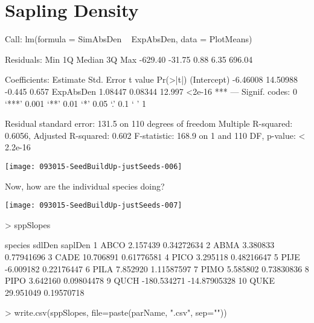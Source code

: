 \documentclass{article}
\begin{document}
\newpage

\section{Sapling Density}
\begin{Schunk}
\begin{Soutput}
Call:
lm(formula = SimAbsDen ~ ExpAbsDen, data = PlotMeans)

Residuals:
    Min      1Q  Median      3Q     Max 
-629.40  -31.75    0.88    6.35  696.04 

Coefficients:
            Estimate Std. Error t value Pr(>|t|)    
(Intercept) -6.46008   14.50988  -0.445    0.657    
ExpAbsDen    1.08447    0.08344  12.997   <2e-16 ***
---
Signif. codes:  0 ‘***’ 0.001 ‘**’ 0.01 ‘*’ 0.05 ‘.’ 0.1 ‘ ’ 1

Residual standard error: 131.5 on 110 degrees of freedom
Multiple R-squared:  0.6056,	Adjusted R-squared:  0.602 
F-statistic: 168.9 on 1 and 110 DF,  p-value: < 2.2e-16
\end{Soutput}
\end{Schunk}
\texttt{[image: 093015-SeedBuildUp-justSeeds-006]}

Now, how are the individual species doing?

\texttt{[image: 093015-SeedBuildUp-justSeeds-007]}
\begin{Schunk}
\begin{Sinput}
>   sppSlopes
\end{Sinput}
\begin{Soutput}
   species      sdlDen      saplDen
1     ABCO    2.157439   0.34272634
2     ABMA    3.380833   0.77941696
3     CADE   10.706891   0.61776581
4     PICO    3.295118   0.48216647
5     PIJE   -6.009182   0.22176447
6     PILA    7.852920   1.11587597
7     PIMO    5.585802   0.73830836
8     PIPO    3.642160   0.09804478
9     QUCH -180.534271 -14.87905328
10    QUKE   29.951049   0.19570718
\end{Soutput}
\begin{Sinput}
>     write.csv(sppSlopes, file=paste(parName, ".csv", sep=""))
\end{Sinput}
\end{Schunk}
\end{document}
